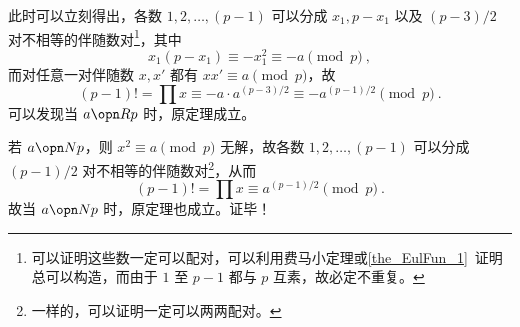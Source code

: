 此时可以立刻得出，各数 $1, 2, \dots, (p-1)$ 可以分成 $x_1, p-x_1$ 以及 $(p-3)/2$ 对不相等的伴随数对\footnote{可以证明这些数一定可以配对，可以利用费马小定理或\autoref{the_EulFun_1}~证明总可以构造，而由于 $1$ 至 $p-1$ 都与 $p$ 互素，故必定不重复。}，其中
\begin{equation}
x_1(p-x_1) \equiv -x_1^2 \equiv -a \pmod p ~,
\end{equation}
而对任意一对伴随数 $x, x'$ 都有 $xx' \equiv a \pmod p$，故
\begin{equation}
(p-1)! = \prod x \equiv -a \cdot a^{(p-3)/2} \equiv -a ^{(p-1)/2} \pmod p ~.
\end{equation}
可以发现当 $a \opn R p$ 时，原定理成立。

若 $a \opn N p$，则 $x^2 \equiv a \pmod p$ 无解，故各数 $1, 2, \dots, (p-1)$ 可以分成 $(p-1)/2$ 对不相等的伴随数对\footnote{一样的，可以证明一定可以两两配对。}，从而
\begin{equation}
(p-1)! = \prod x \equiv a^{(p-1)/2} \pmod p ~.
\end{equation}
故当 $a \opn N p$ 时，原定理也成立。证毕！